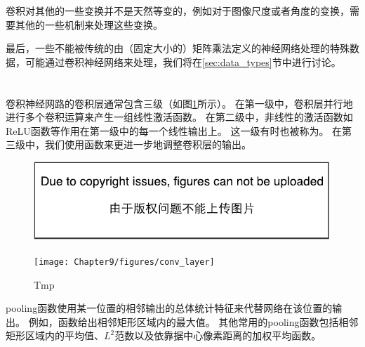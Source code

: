  
卷积对其他的一些变换并不是天然等变的，例如对于图像尺度或者角度的变换，需要其他的一些机制来处理这些变换。

最后，一些不能被传统的由（固定大小的）矩阵乘法定义的神经网络处理的特殊数据，可能通过卷积神经网络来处理，我们将在\ref{sec:data_types}节中进行讨论。

\section{}
\label{sec:pooling}

卷积神经网路的卷积层通常包含三级（如图\ref{fig:chap9_conv_layer}所示）。
在第一级中，卷积层并行地进行多个卷积运算来产生一组线性激活函数。
在第二级中，非线性的激活函数如\gls{ReLU}函数等作用在第一级中的每一个线性输出上。
这一级有时也被称为。
在第三级中，我们使用函数来更进一步地调整卷积层的输出。
\begin{figure}[!htb]
\ifOpenSource
\centerline{\includegraphics{figure.pdf}}
\else
\centerline{\texttt{[image: Chapter9/figures/conv\_layer]}}
\fi
\caption{Tmp}
\label{fig:chap9_conv_layer}
\end{figure}

\gls{pooling}函数使用某一位置的相邻输出的总体统计特征来代替网络在该位置的输出。
例如，函数\citep{zhou1988computation}给出相邻矩形区域内的最大值。
其他常用的\gls{pooling}函数包括相邻矩形区域内的平均值、$L^2$范数以及依靠据中心像素距离的加权平均函数。

 
